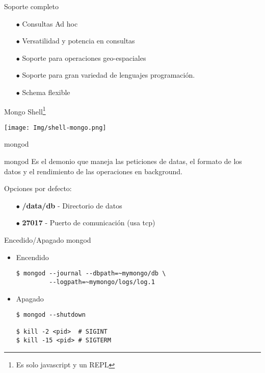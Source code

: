 \documentclass[12pt]{beamer}
\begin{document}
\begin{frame}{Soporte completo}
  \begin{itemize}
  \item[$\bullet$] Consultas Ad hoc

  \item[$\bullet$] Versatilidad y potencia en consultas

  \item[$\bullet$] Soporte para operaciones geo-espaciales

  \item[$\bullet$] Soporte para gran variedad de lenguajes
    programación.

  \item[$\bullet$] Schema flexible
  \end{itemize}
\end{frame}

\begin{frame}{Mongo Shell\footnote{Es solo javascript y un REPL}}
  \begin{center}
    \texttt{[image: Img/shell-mongo.png]}    
  \end{center}
\end{frame}


\begin{frame}[fragile]{mongod}
  \begin{block}{mongod}
    Es el demonio que maneja las peticiones de datas, el formato de los
    datos y el rendimiento de las operaciones en background.
  \end{block}

  Opciones por defecto:
  
  \begin{itemize}
      \item[$\bullet$] \textbf{/data/db} - Directorio de datos
      \item[$\bullet$] \textbf{27017} - Puerto de comunicación (usa tcp)
  \end{itemize}
\end{frame}


\begin{frame}[fragile]{Encedido/Apagado mongod}
  
  \begin{itemize}
    \item Encendido

    \begin{verbatim}
$ mongod --journal --dbpath=~mymongo/db \
         --logpath=~mymongo/logs/log.1
    \end{verbatim}
    
    \item Apagado
      \begin{verbatim}
$ mongod --shutdown
      
$ kill -2 <pid>  # SIGINT
$ kill -15 <pid> # SIGTERM
      \end{verbatim}
  \end{itemize}
\end{frame}
\end{document}
